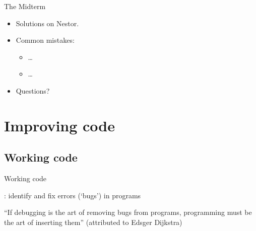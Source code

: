 \documentclass[aspectratio=169,usenames,dvipsnames]{beamer}
\begin{document}
\begin{frame}{The Midterm}
    \begin{itemize}
        \item Solutions on Nestor.
        \item Common mistakes:
            \begin{itemize}
                \item \dots
                \item \dots
            \end{itemize}
        \item Questions?
    \end{itemize}
\end{frame}

\section{Improving code}
\subsection{Working code}
\frame{\tableofcontents[currentsection]}
\begin{frame}{Working code}
    \begin{definition}
        : identify and fix errors (`bugs') in programs
    \end{definition}

    \pause\vspace{1em}
    ``If debugging is the art of removing bugs from programs,
    programming must be the art of inserting them''
    (attributed to Edsger Dijkstra)
\end{frame}
\end{document}
